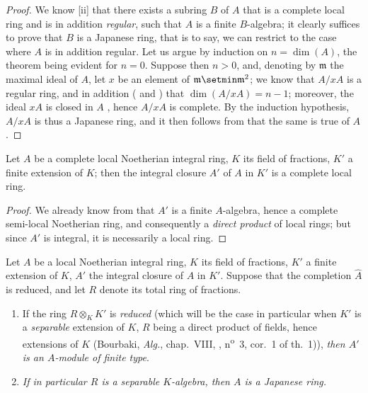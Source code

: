 \begin{proof}
We know [ii] that there exists a subring $B$ of $A$ that is a complete local
ring and is in addition \emph{regular}, such that $A$ is a finite $B$-algebra; it clearly suffices to prove that $B$ is a Japanese ring, that is to say, we can restrict to the case where $A$ is in addition regular.
Let us argue by induction on $n=\dim(A)$, the theorem being evident for $n=0$.
Suppose then $n>0$, and, denoting by $\mathfrak{m}$ the maximal ideal of $A$, let $x$ be an element of $\mathfrak{m}\setmin\mathfrak{m}^2$; we know  that $A/xA$ is a regular ring, and in addition ( and ) that $\dim(A/xA)=n-1$; moreover, the ideal $xA$ is closed in $A$ , hence $A/xA$ is complete.
By the induction hypothesis, $A/xA$ is thus a Japanese ring, and it then follows from  that the same is true of $A$.
\end{proof}

\begin{corollary}[23.1.6]
\label{0.23.1.6}
Let $A$ be a complete local Noetherian integral ring, $K$ its field of fractions, $K'$ a finite extension of $K$; then the integral closure $A'$ of $A$ in $K'$ is a complete local ring.
\end{corollary}

\begin{proof}
We already know from  that $A'$ is a finite $A$-algebra, hence a complete semi-local Noetherian ring, and consequently a \emph{direct product} of local rings; but since $A'$ is integral, it is necessarily a local ring.
\end{proof}

\begin{proposition}[23.1.7]
\label{0.23.1.7}
Let $A$ be a local Noetherian integral ring, $K$ its field of fractions, $K'$ a finite extension of $K$, $A'$ the integral closure of $A$ in $K'$.
Suppose that the completion $\hat{A}$ is reduced, and let $R$ denote its total ring of fractions.
\begin{enumerate}
  \item[{\rm(i)}] If the ring $R\otimes_K K'$ is \emph{reduced} (which will be the case in particular when $K'$ is a \emph{separable} extension of $K$, $R$ being a direct product of fields, hence extensions of $K$ \textnormal{(Bourbaki, \emph{Alg.}, chap.~VIII, , n\textsuperscript{o}~3, cor.~1 of th.~1)}), \emph{then $A'$ is an $A$-module of finite type}.
  \item[{\rm(ii)}] \emph{If in particular $R$ is a separable $K$-algebra, then $A$ is a Japanese ring.}
\end{enumerate}
\end{proposition}

